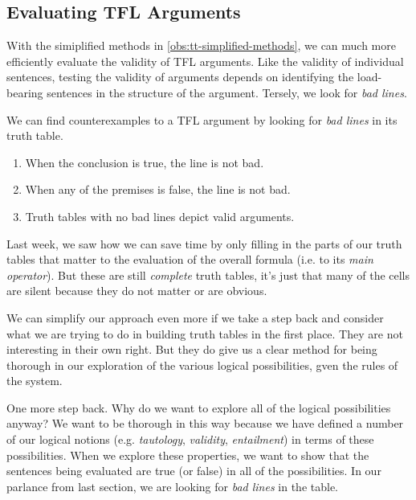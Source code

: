 \subsection{Evaluating TFL Arguments}

With the simiplified methods in \ref{obs:tt-simplified-methods}, we can much
more efficiently evaluate the validity of TFL arguments. Like the validity of
individual sentences, testing the validity of arguments depends on identifying
the load-bearing sentences in the structure of the argument. Tersely, we look
for \emph{bad lines}.

\begin{observation}
  \label{obs:tt-bad-lines}
  We can find counterexamples to a TFL argument by looking for \emph{bad lines}
  in its truth table.
  \begin{enumerate}
  \item When the conclusion is true, the line is not bad.
  \item When any of the premises is false, the line is not bad.
  \item Truth tables with no bad lines depict valid arguments.
  \end{enumerate}
\end{observation}


Last week, we saw how we can save time by only filling in the parts of our
truth tables that matter to the evaluation of the overall formula (i.e.
to its \emph{main operator}). But these are still \emph{complete} truth tables,
it's just that many of the cells are silent because they do not matter or are
obvious.

We can simplify our approach even more if we take a step back and consider what
we are trying to do in building truth tables in the first place. They are not
interesting in their own right. But they do give us a clear method for being
thorough in our exploration of the various logical possibilities, gven the rules
of the system.

One more step back. Why do we want to explore all of the logical possibilities
anyway? We want to be thorough in this way because we have defined a number of
our logical notions (e.g. \emph{tautology}, \emph{validity}, \emph{entailment})
in terms of these possibilities. When we explore these properties, we want to
show that the sentences being evaluated are true (or false) in all of the
possibilities. In our parlance from last section, we are looking for \emph{bad
lines} in the table.

